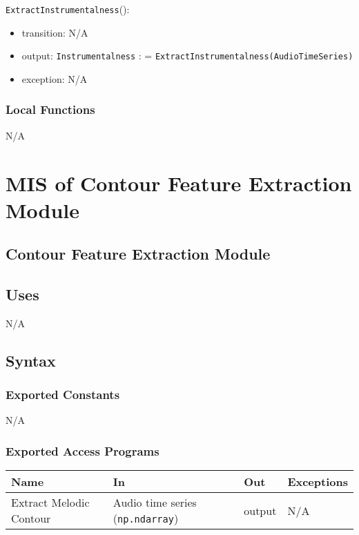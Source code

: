\documentclass[12pt, titlepage]{article}
\begin{document}
\noindent \texttt{Extract\textunderscore Instrumentalness}():
\begin{itemize}
\item transition: N/A
\item output: \texttt{Instrumentalness} : = \texttt{Extract\textunderscore Instrumentalness(Audio\textunderscore Time\textunderscore Series)}
\item exception: N/A
\end{itemize}

\subsubsection{Local Functions}
N/A

\section{MIS of Contour Feature Extraction Module} 

\subsection{Contour Feature Extraction Module}

\subsection{Uses}
N/A

\subsection{Syntax}

\subsubsection{Exported Constants}
N/A

\subsubsection{Exported Access Programs}

\begin{center}
\begin{tabular}{p{2cm} p{4cm} p{4cm} p{2cm}}
\hline
\textbf{Name} & \textbf{In} & \textbf{Out} & \textbf{Exceptions}\\
\hline%
Extract Melodic Contour &Audio time series (\texttt{np.ndarray}) &output &N/A\\
\hline
\end{tabular}
\end{center}
\end{document}
